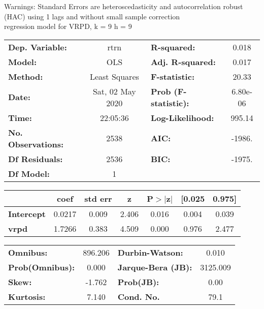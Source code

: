 Warnings: \newline
 [1] Standard Errors are heteroscedasticity and autocorrelation robust (HAC) using 1 lags and without small sample correction\\ 

regression model for VRPD, k = 9 h = 9\begin{center}
\begin{tabular}{lclc}
\toprule
\textbf{Dep. Variable:}    &       rtrn       & \textbf{  R-squared:         } &     0.018   \\
\textbf{Model:}            &       OLS        & \textbf{  Adj. R-squared:    } &     0.017   \\
\textbf{Method:}           &  Least Squares   & \textbf{  F-statistic:       } &     20.33   \\
\textbf{Date:}             & Sat, 02 May 2020 & \textbf{  Prob (F-statistic):} &  6.80e-06   \\
\textbf{Time:}             &     22:05:36     & \textbf{  Log-Likelihood:    } &    995.14   \\
\textbf{No. Observations:} &        2538      & \textbf{  AIC:               } &    -1986.   \\
\textbf{Df Residuals:}     &        2536      & \textbf{  BIC:               } &    -1975.   \\
\textbf{Df Model:}         &           1      & \textbf{                     } &             \\
\bottomrule
\end{tabular}
\begin{tabular}{lcccccc}
                   & \textbf{coef} & \textbf{std err} & \textbf{z} & \textbf{P$> |$z$|$} & \textbf{[0.025} & \textbf{0.975]}  \\
\midrule
\textbf{Intercept} &       0.0217  &        0.009     &     2.406  &         0.016        &        0.004    &        0.039     \\
\textbf{vrpd}      &       1.7266  &        0.383     &     4.509  &         0.000        &        0.976    &        2.477     \\
\bottomrule
\end{tabular}
\begin{tabular}{lclc}
\textbf{Omnibus:}       & 896.206 & \textbf{  Durbin-Watson:     } &    0.010  \\
\textbf{Prob(Omnibus):} &   0.000 & \textbf{  Jarque-Bera (JB):  } & 3125.009  \\
\textbf{Skew:}          &  -1.762 & \textbf{  Prob(JB):          } &     0.00  \\
\textbf{Kurtosis:}      &   7.140 & \textbf{  Cond. No.          } &     79.1  \\
\bottomrule
\end{tabular}
\end{center}

